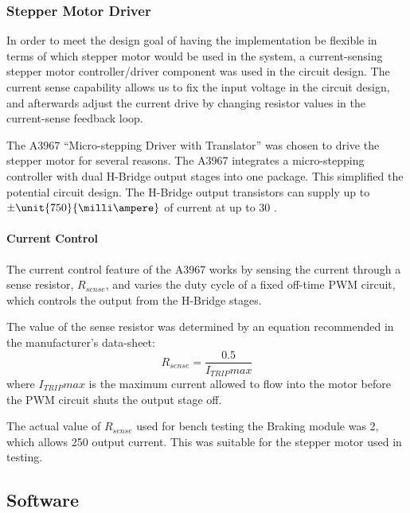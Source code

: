 \subsubsection{Stepper Motor Driver}

In order to meet the design goal of having the implementation be flexible in terms of which stepper motor would be used in the system, a current-sensing stepper motor controller/driver component was used in the circuit design. The current sense capability allows us to fix the input voltage in the circuit design, and afterwards adjust the current drive by changing resistor values in the current-sense feedback loop. 

The A3967 ``Micro-stepping Driver with Translator'' was chosen to drive the stepper motor for several reasons. The A3967 integrates a micro-stepping controller with dual H-Bridge output stages into one package. This simplified the potential circuit design. The H-Bridge output transistors can supply up to $\pm\unit{750}{\milli\ampere}$ of current at up to \unit{30}{\volt} \cite{A3967}. 

\paragraph{Current Control}

The current control feature of the A3967 works by sensing the current through a sense resistor, $R_{sense}$, and varies the duty cycle of a fixed off-time PWM circuit, which controls the output from the H-Bridge stages.

The value of the sense resistor was determined by an equation recommended in the manufacturer's data-sheet:
\begin{equation}
R_{sense}=\frac{0.5}{I_{TRIP}max}
\end{equation}
where $I_{TRIP}max$ is the maximum current allowed to flow into the motor before the PWM circuit shuts the output stage off.

The actual value of $R_{sense}$ used for bench testing the Braking module was \unit{2}{\ohm}, which allows \unit{250}{\milli\ampere} output current. This was suitable for the stepper motor used in testing.

\subsection{Software}


